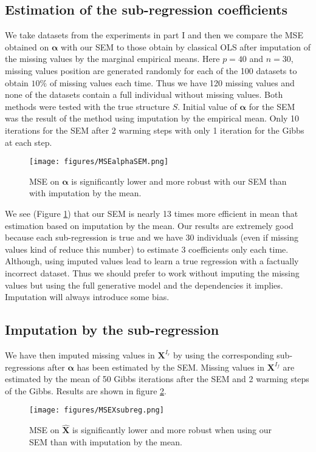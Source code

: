 \documentclass[12pt,a4paper]{report}
\begin{document}
		\subsection{Estimation of the sub-regression coefficients}
			We take datasets from the experiments in part I and then we compare the MSE obtained on $\boldsymbol{\alpha}$ with our SEM to those obtain by classical OLS after imputation of the missing values by the marginal empirical means. Here $p=40$ and $n=30$, missing values position are generated randomly for each of the 100 datasets to obtain $10 \%$ of missing values each time. Thus we have 120 missing values and none of the datasets contain a full individual without missing values.
Both methods were tested with the true structure $S$. Initial value of $\boldsymbol{\alpha}$ for the SEM was the result of the method using imputation by the empirical mean. Only 10 iterations for the SEM after 2 warming steps with only 1 iteration for the Gibbs at each step.

\begin{figure}[h!]
	\centering
	\texttt{[image: figures/MSEalphaSEM.png]} 
	\caption{MSE on $\boldsymbol{\alpha}$ is significantly lower and more robust with our SEM than with imputation by the mean.}\label{MSEalphaSEM}
\end{figure}

	We see (Figure \ref{MSEalphaSEM}) that our SEM is nearly 13 times more efficient in mean that estimation based on imputation by the mean. Our results are extremely good because each sub-regression is true and we have 30 individuals (even if missing values kind of reduce this number) to estimate 3 coefficients only each time. Although, using imputed values lead to learn a true regression with a factually incorrect dataset. Thus we should prefer to work without imputing the missing values but using the full generative model and the dependencies it implies. Imputation will always introduce some bias.

		
			\subsection{Imputation by the sub-regression}
			We have then imputed missing values in $\boldsymbol{X}^{I_r}$  by using the corresponding sub-regressions after $\boldsymbol{\alpha}$ has been estimated  by the SEM.
			Missing values in $\boldsymbol{X}^{I_f}$ are estimated by the mean of 50 Gibbs iterations after the SEM and 2 warming steps of the Gibbs. Results are shown in figure \ref{MSEXsubreg}.
			\begin{figure}[h!]
	\centering
	\texttt{[image: figures/MSEXsubreg.png]} 
	\caption{MSE on $\hat{\boldsymbol{X}}$ is significantly lower and more robust when using our SEM than with imputation by the mean.}\label{MSEXsubreg}
\end{figure}
\FloatBarrier
\end{document}
